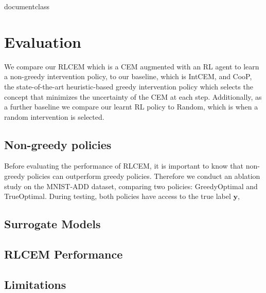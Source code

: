 \csname documentclass

\chapter{Evaluation}

We compare our RLCEM which is a CEM augmented with an RL agent to learn 
a non-greedy intervention policy, to our baseline, which is IntCEM, and CooP,
the state-of-the-art heuristic-based greedy intervention policy which 
selects the concept that minimizes the uncertainty of the CEM at each step. Additionally,
as a further baseline we compare our learnt RL policy to Random,
which is when a random intervention is selected.

\section{Non-greedy policies}

Before evaluating the performance of RLCEM, it is important to know that 
non-greedy policies can outperform greedy policies. Therefore we conduct an
ablation study on the MNIST-ADD dataset, comparing two policies:
GreedyOptimal and TrueOptimal.
During testing, both policies have access to the true label
$\mathbf{y}$, 

\section{Surrogate Models}

\section{RLCEM Performance}

\section{Limitations}


